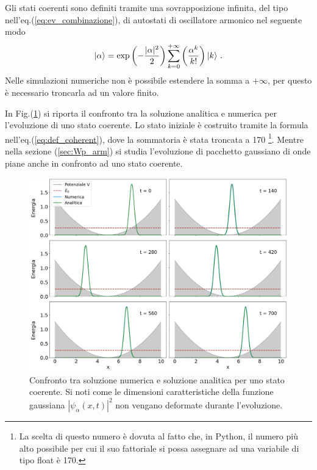 \documentclass[12pt]{report}
\begin{document}
Gli stati coerenti sono definiti tramite una sovrapposizione infinita, del tipo nell'eq.(\ref{eq:ev_combinazione}), di autostati di oscillatore armonico nel seguente modo
\begin{equation}
    \centering
    \ket{\alpha} = \exp \left(- \frac{|\alpha|^2}{2}\right) \sum_{k=0}^{+ \infty} \left( \frac{\alpha^k}{k!} \right) \ket{k} \, \text{.}
    \label{eq:def_coherent}
\end{equation} 
Nelle simulazioni numeriche non è possibile estendere la somma a $+\infty$, per questo è necessario troncarla ad un valore finito.

In Fig.(\ref{fig:coherent_ev}) si riporta il confronto tra la soluzione analitica e numerica per l'evoluzione di uno stato coerente. Lo stato iniziale è costruito tramite la formula nell'eq.(\ref{eq:def_coherent}), dove la sommatoria è stata troncata a 170 \footnote{La scelta di questo numero è dovuta al fatto che, in Python, il numero più alto possibile per cui il suo fattoriale si possa assegnare ad una variabile di tipo float è 170.}. Mentre nella sezione (\ref{sec:Wp_arm}) si studia l'evoluzione di pacchetto gaussiano di onde piane anche in confronto ad uno stato coerente.

\begin{figure}
    \centering
    \includegraphics[width = \textwidth]{immagini/coherent_ev.png}
    \caption{ \textcolor{dark-gray}{Confronto tra soluzione numerica e soluzione analitica per uno stato coerente. Si noti come le dimensioni caratteristiche della funzione gaussiana $|\psi_{\alpha}(x, t)|^{2}$ non vengano deformate durante l'evoluzione.}}
    \label{fig:coherent_ev}
\end{figure}
\end{document}
